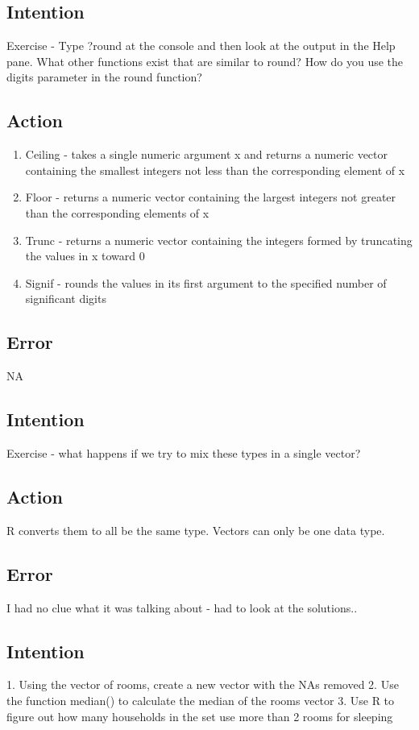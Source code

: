 \documentclass{article}
\begin{document}
\subsection{Intention}
Exercise - Type ?round at the console and then look at the output in the Help pane. What other functions exist that are similar to round? How do you use the digits parameter in the round function?

\subsection{Action}
\begin{enumerate}
    \item Ceiling - takes a single numeric argument x and returns a numeric vector containing the smallest integers not less than the corresponding element of x
    \item Floor - returns a numeric vector containing the largest integers not greater than the corresponding elements of x
    \item Trunc - returns a numeric vector containing the integers formed by truncating the values in x toward 0
    \item Signif - rounds the values in its first argument to the specified number of significant digits
\end{enumerate}

\subsection{Error}
NA

\subsection{Intention}
Exercise - what happens if we try to mix these types in a single vector?

\subsection{Action}
R converts them to all be the same type. Vectors can only be one data type.

\subsection{Error}
I had no clue what it was talking about - had to look at the solutions..

\subsection{Intention}
1. Using the vector of rooms, create a new vector with the NAs removed
2. Use the function median() to calculate the median of the rooms vector 
3. Use R to figure out how many households in the set use more than 2 rooms for sleeping
\end{document}
